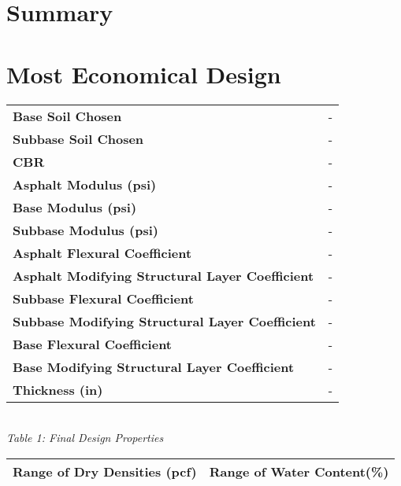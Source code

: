 \documentclass{article}
\begin{document}

\newpage
\doublespacing
\tableofcontents
\newpage
{}
\listoftables
{}
\listoffigures
\newpage
\section{Summary}
\newpage
\section{Most Economical Design}
\begin{center}
    \begin{tabular}{|l|r|}
    \hline
    \textbf{Base Soil Chosen}                               & -  \\
    \textbf{Subbase Soil Chosen}                              & -  \\
    \textbf{CBR}                                              & -  \\
    \textbf{Asphalt Modulus (psi)}                            & -  \\
    \textbf{Base Modulus (psi)}                               & -  \\
    \textbf{Subbase Modulus (psi)}                            & -  \\
    \textbf{Asphalt Flexural Coefficient}                     & -  \\
    \textbf{Asphalt Modifying Structural Layer Coefficient} & -  \\
    \textbf{Subbase Flexural Coefficient}                     & -  \\
    \textbf{Subbase Modifying Structural Layer Coefficient} & -  \\
    \textbf{Base Flexural Coefficient}                        & -  \\
    \textbf{Base Modifying Structural Layer Coefficient}  & -  \\
    \textbf{Thickness (in)}                                   & - \\\hline
    \end{tabular}
    \vspace{3mm}
    \emph{\\Table 1: Final Design Properties\\}
    \vspace{10mm}
    \begin{tabular}{|cc|cc|}
        \hline
        \multicolumn{2}{|c|}{\textbf{Range of Dry Densities (pcf)}}      & \multicolumn{2}{|c|}{\textbf{Range of Water Content(\%)}}          \\\hline

\end{tabular}
\end{center}
\end{document}
